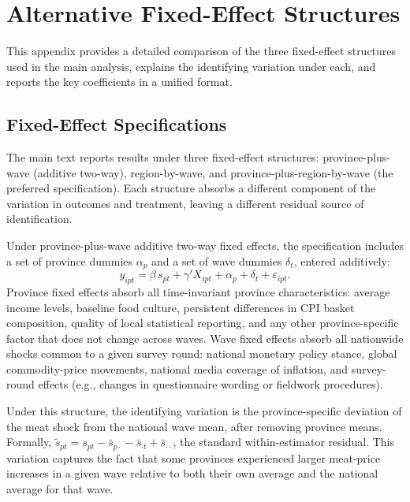 
\section{Alternative Fixed-Effect Structures}\label{app:altfe}

This appendix provides a detailed comparison of the three
fixed-effect structures used in the main analysis, explains
the identifying variation under each, and reports the key
coefficients in a unified format.

\subsection{Fixed-Effect Specifications}

The main text reports results under three fixed-effect
structures: province-plus-wave (additive two-way),
region-by-wave, and province-plus-region-by-wave (the preferred
specification).
Each structure absorbs a different component of the variation
in outcomes and treatment, leaving a different residual source
of identification.

Under province-plus-wave additive two-way fixed effects, the
specification includes a set of province dummies
$\alpha_p$ and a set of wave dummies $\delta_t$, entered
additively:
\[
  y_{ipt} = \beta\,s_{pt} + \gamma' X_{ipt}
    + \alpha_p + \delta_t + \varepsilon_{ipt}.
\]
Province fixed effects absorb all time-invariant province
characteristics: average income levels, baseline food culture,
persistent differences in CPI basket composition, quality of
local statistical reporting, and any other province-specific
factor that does not change across waves.
Wave fixed effects absorb all nationwide shocks common to a
given survey round: national monetary policy stance, global
commodity-price movements, national media coverage of
inflation, and survey-round effects (e.g., changes in
questionnaire wording or fieldwork procedures).

Under this structure, the identifying variation is the
province-specific deviation of the meat shock from the
national wave mean, after removing province means.
Formally, $\tilde{s}_{pt} = s_{pt} - \bar{s}_{p\cdot}
- \bar{s}_{\cdot t} + \bar{s}_{\cdot\cdot}$, the standard
within-estimator residual.
This variation captures the fact that some provinces
experienced larger meat-price increases in a given wave
relative to both their own average and the national average
for that wave.

